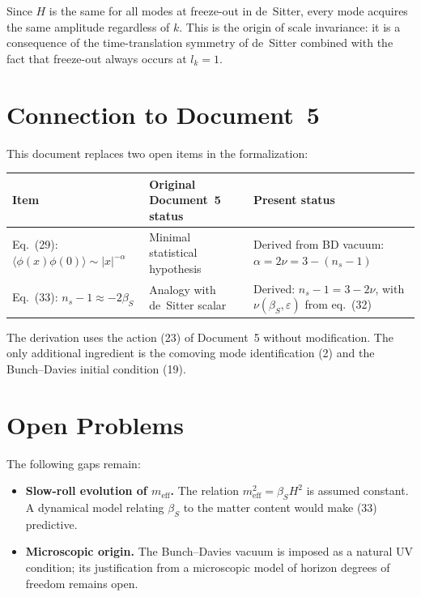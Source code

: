 \documentclass[12pt,a4paper]{article}
\begin{document}
Since $H$ is the same for all modes at freeze-out in de~Sitter, every mode acquires the same amplitude regardless of $k$. This is the origin of scale invariance: it is a consequence of the time-translation symmetry of de~Sitter combined with the fact that freeze-out always occurs at $l_k = 1$.

\section{Connection to Document~5}

This document replaces two open items in the formalization:

\begin{table}[h]
\centering
\small
\begin{tabular}{lp{4cm}p{6.5cm}}
\toprule
Item & Original Document~5 status & Present status \\
\midrule
Eq.~(29): $\langle\phi(x)\phi(0)\rangle \sim |x|^{-\alpha}$ & Minimal statistical hypothesis & Derived from BD vacuum: $\alpha = 2\nu = 3 - (n_s - 1)$ \\[4pt]
Eq.~(33): $n_s - 1 \approx -2\beta_S$ & Analogy with de~Sitter scalar & Derived: $n_s - 1 = 3 - 2\nu$, with $\nu(\beta_S, \varepsilon)$ from eq.~(32) \\
\bottomrule
\end{tabular}
\end{table}

The derivation uses the action (23) of Document~5 without modification. The only additional ingredient is the comoving mode identification (2) and the Bunch--Davies initial condition (19).

\section{Open Problems}

The following gaps remain:

\begin{itemize}
  \item \textbf{Slow-roll evolution of $m_\text{eff}$.} The relation $m_\text{eff}^2 = \beta_S H^2$ is assumed constant. A dynamical model relating $\beta_S$ to the matter content would make (33) predictive.
  \item \textbf{Microscopic origin.} The Bunch--Davies vacuum is imposed as a natural UV condition; its justification from a microscopic model of horizon degrees of freedom remains open.
\end{itemize}
\end{document}

